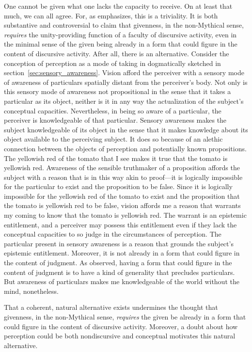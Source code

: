 \documentclass[12pt]{article}
\begin{document}
One cannot be given what one lacks the capacity to receive. On at least that much, we can all agree. For, as \citet{Travis:2008uq} emphasizes, this is a triviality. It is both substantive and controversial to claim that givenness, in the non-Mythical sense, \emph{requires} the unity-providing function of a faculty of discursive activity, even in the minimal sense of the given being already in a form that could figure in the content of discursive activity. After all, there is an alternative. Consider the conception of perception as a mode of taking in dogmatically sketched in section~\ref{sec:sensory_awareness}. Vision afford the perceiver with a sensory mode of awareness of particulars spatially distant from the perceiver's body. Not only is this sensory mode of awareness not propositional in the sense that it takes a particular as its object, neither is it in any way the actualization of the subject's conceptual capacities. Nevertheless, in being so aware of a particular, the perceiver is knowledgeable of that particular. Sensory awareness makes the subject knowledgeable of its object in the sense that it makes knowledge about its object available to the perceiving subject. It does so because of an alethic connection between the objects of perception and potentially known propositions. The yellowish red of the tomato that I see makes it true that the tomato is yellowish red. Awareness of the sensible truthmaker of a proposition affords the subject with a reason that is in this way akin to proof---it is logically impossible for the particular to exist and the proposition to be false. Since it is logically impossible for the yellowish red of the tomato to exist and the proposition that the tomato is yellowish red to be false, vision affords me a reason that warrants my coming to know that the tomato is yellowish red. The warrant is an epistemic entitlement, and a perceiver may possess this entitlement even if they lack the conceptual capacities to so judge in the circumstances of perception. The particular present in sensory awareness is a reason that grounds the subject's epistemic entitlement. Moreover, it is not already in a form that could figure in the content of judgment. As \citet[44]{Prichard:1909yg} observed, having a form that could figure in the content of judgment is to have a kind of generality that precludes particulars. But awareness of particulars makes me knowledgeable of the world without the mind, nonetheless. 

That a coherent, natural alternative exists undermines the thought that givenness, in the non-Mythical sense, \emph{requires} the given be already in a form that could figure in the content of discursive activity. Moreover, a doubt about how perception could be both nondiscursive and conceptual motivates this natural alternative.
\end{document}
